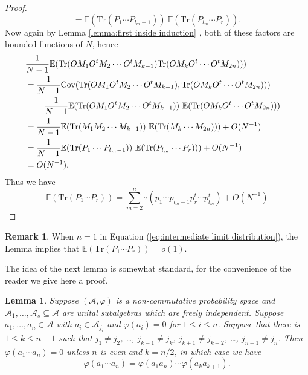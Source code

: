 \documentclass[11pt]{amsart}
\newtheorem{lemma}[theorem]{Lemma}
\theoremstyle{definition}
\newtheorem{remark}[theorem]{Remark}
\numberwithin{theorem}{section}
\newcommand{\cA}{\mathcal{A}}
\let\phi=\varphi
\newcommand{\cov}{\mathrm{Cov}}
\newcommand{\rE} {\mathbb{E}}
\newcommand{\Tr}{\mathrm{Tr}}
\newcommand{\ab}{\allowbreak}
\begin{document}
\begin{proof}
\[\]
\[
=
\rE(\Tr( P_1 \cdots P_{l_m -1 }))\ \rE(\Tr( P_{l_m} \cdots P_{r})).
\]
Now again by Lemma \ref{lemma:first inside induction} , both
of these factors are bounded functions of $N$, hence
\begin{align*}\lefteqn{
\frac{1}{N - 1}
\rE( \Tr(O M_1 O^t M_2 \cdots O^t M_{k-1}) \Tr(O M_{k} O^t \cdots O^t M_{2n}) ))} \\
& =
\frac{1}{N - 1} \cov(\Tr(O M_1 O^t M_2 \cdots O^t M_{k-1}), 
                     \Tr(OM_{k} O^t \cdots O^t M_{2n}) )) \\
& \quad+
\frac{1}{N - 1} \rE(\Tr(O M_1 O^t M_2 \cdots O^t M_{k-1})) \
                 \rE(\Tr(O M_{k} O^t \cdots O^t M_{2n}) )) \\
& =
\frac{1}{N - 1} \rE(\Tr(M_1 M_2 \cdots M_{k-1})) \
                 \rE(\Tr(M_{k}  \cdots  M_{2n}) )) + O(N^{-1}) \\
&=
                 \frac{1}{N - 1} \rE(\Tr(P_1 \cdots P_{l_m-1})) \
                 \rE(\Tr(P_{l_m}  \cdots  P_{r}) )) + O(N^{-1}) \\
& = O(N^{-1}).
\end{align*}
Thus we have 
\[
\rE(\Tr(P_1 \cdots P_r))
=
\sum_{m=2}^n \tau(p_1 \cdots p_{l_m-1} p_r^t \cdots p_{l_m}^t ) + O(N^{-1})
\]
\end{proof} 



\begin{remark}
When $n = 1$ in Equation (\ref{eq:intermediate limit
  distribution}), the Lemma implies that $\rE(\Tr(P_1
\ab\cdots\ab P_r)) = o(1)$.
\end{remark}


The idea of the next lemma is somewhat standard, for the
convenience of the reader we give here a proof.


\begin{lemma}\label{lemma:standard reduction}
Suppose $(\cA, \phi)$ is a non-commutative probability space
and $\cA_1,\ab \dots, \cA_s \subseteq \cA$ are unital
subalgebras which are freely independent. Suppose $a_1,
\dots, a_n \in \cA$ with $a_i \in \cA_{j_i}$ and $\phi(a_i)
= 0$ for $1 \leq i \leq n$. Suppose that there is $1 \leq k
\leq n-1$ such that $j_1 \not = j_2$, \dots, $j_{k-1} \not =
j_k$, $j_{k+1} \not = j_{k+2}$, \dots, $j_{n-1} \not =
j_n$. Then $\phi(a_1 \cdots a_n) = 0$ unless $n$ is even and
$k = n/2$, in which case we have
\begin{equation}\label{eq:reduction by folding}
\phi(a_1 \cdots a_n) = \phi(a_1 a_n) \cdots \phi(a_k a_{k+1}).
\end{equation}
\end{lemma}
\end{document}
